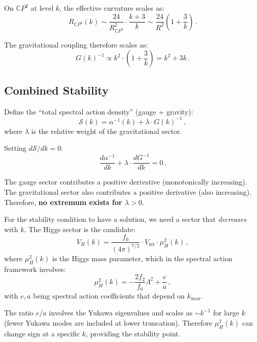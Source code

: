 \documentclass[11pt,a4paper]{article}
\newcommand{\CP}{\mathbb{C}P}
\begin{document}
On $\CP^2$ at level $k$, the effective curvature scales as:
\begin{equation}
R_{\CP^2}(k) \sim \frac{24}{R_{\CP^2}^2} \cdot \frac{k+3}{k} \sim \frac{24}{R^2}\left(1 + \frac{3}{k}\right)\,.
\end{equation}

The gravitational coupling therefore scales as:
\begin{equation}
G(k)^{-1} \propto k^2 \cdot \left(1 + \frac{3}{k}\right) = k^2 + 3k\,.
\end{equation}

\subsection{Combined Stability}

Define the ``total spectral action density'' (gauge + gravity):
\begin{equation}
\mathcal{S}(k) = \alpha^{-1}(k) + \lambda \cdot G(k)^{-1}\,,
\end{equation}
where $\lambda$ is the relative weight of the gravitational sector.

Setting $d\mathcal{S}/dk = 0$:
\begin{equation}
\frac{d\alpha^{-1}}{dk} + \lambda \cdot \frac{dG^{-1}}{dk} = 0\,.
\end{equation}

The gauge sector contributes a positive derivative (monotonically increasing). The gravitational sector also contributes a positive derivative (also increasing). Therefore, \textbf{no extremum exists for $\lambda > 0$}.

For the stability condition to have a solution, we need a sector that \emph{decreases} with $k$. The Higgs sector is the candidate:
\begin{equation}
V_H(k) = \frac{f_0}{(4\pi)^{7/2}} \cdot V_{\mathrm{int}} \cdot \mu_H^2(k)\,,
\end{equation}
where $\mu_H^2(k)$ is the Higgs mass parameter, which in the spectral action framework involves:
\begin{equation}
\mu_H^2(k) = -\frac{2f_2}{f_0}\Lambda^2 + \frac{e}{a}\,,
\end{equation}
with $e, a$ being spectral action coefficients that depend on $k_{\max}$.

The ratio $e/a$ involves the Yukawa eigenvalues and scales as $\sim k^{-1}$ for large $k$ (fewer Yukawa modes are included at lower truncation). Therefore $\mu_H^2(k)$ can change sign at a specific $k$, providing the stability point.
\end{document}

